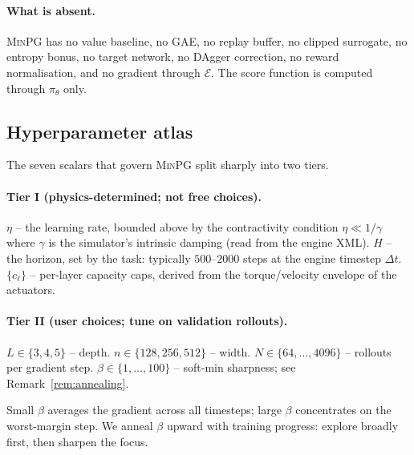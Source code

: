 \paragraph{What is absent.} \textsc{MinPG} has no value baseline, no
GAE, no replay buffer, no clipped surrogate, no entropy bonus, no
target network, no DAgger correction, no reward normalisation, and no
gradient through $\mathcal{E}$. The score function is computed through
$\pi_\theta$ only.

\subsection{Hyperparameter atlas}
\label{sec:hyper}

The seven scalars that govern \textsc{MinPG} split sharply into two
tiers.

\paragraph{Tier I (physics-determined; not free choices).}
$\eta$ -- the learning rate, bounded above by the contractivity
condition $\eta \ll 1/\gamma$ where $\gamma$ is the simulator's
intrinsic damping (read from the engine XML).
$H$ -- the horizon, set by the task: typically $500$--$2000$ steps at
the engine timestep $\Delta t$.
$\{c_\ell\}$ -- per-layer capacity caps, derived from the
torque/velocity envelope of the actuators.

\paragraph{Tier II (user choices; tune on validation rollouts).}
$L \in \{3, 4, 5\}$ -- depth.
$n \in \{128, 256, 512\}$ -- width.
$N \in \{64, \dots, 4096\}$ -- rollouts per gradient step.
$\beta \in \{1, \dots, 100\}$ -- soft-min sharpness; see
Remark~\ref{rem:annealing}.

\begin{remark}
\label{rem:annealing}
Small $\beta$ averages the gradient across all timesteps; large $\beta$
concentrates on the worst-margin step. We anneal $\beta$ upward with
training progress: explore broadly first, then sharpen the focus.
\end{remark}
